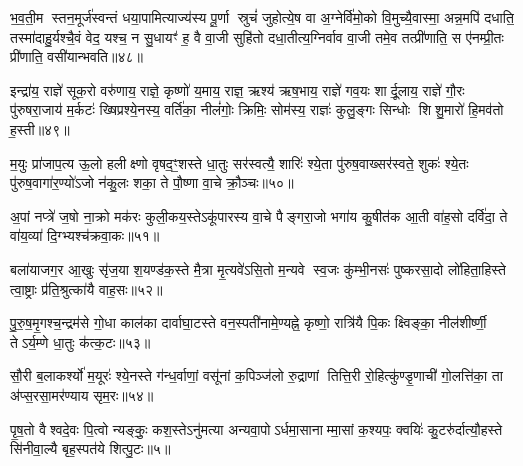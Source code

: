 भ॒व॒ती॒म स्तन॒मूर्ज॑स्वन्तं धया॒पामित्याज्य॑स्य पू॒र्णा स्रुचं॑ जुहोत्ये॒ष वा अ॒ग्नेर्वि॑मो॒को वि॒मुच्यै॒वास्मा॒ अन्न॒मपि॑ दधाति॒ तस्मा॑दाहु॒र्यश्चै॒वं वेद॒ यश्च॒ न सु॒धायꣳ॑ ह॒ वै वा॒जी सुहि॑तो दधा॒तीत्य॒ग्निर्वाव वा॒जी तमे॒व तत्प्री॑णाति॒ स ए॑नम्प्री॒तः प्री॑णाति॒ वसी॑यान्भवति॥४८॥

{\anuvakamend[{प्र॒तीची॒ दिक्तस्यास्ते द्वि॒ष्मो यश्च॑ निलि॒म्पा नामे॒ह गृ॒हा इति॑ लू॒ख्षो वसी॑यान्भवति॥10॥}]}

इन्द्रा॑य॒ राज्ञे॑ सूक॒रो वरु॑णाय॒ राज्ञे॒ कृष्णो॑ य॒माय॒ राज्ञ॒ ऋश्य॑ ऋष॒भाय॒ राज्ञे॑ गव॒यः शार्दू॒लाय॒ राज्ञे॑ गौ॒रः पु॑रुषरा॒जाय॑ म॒र्कटः॑ ख्षिप्रश्ये॒नस्य॒ वर्ति॑का॒ नीलं॑गोः॒ क्रिमिः॒ सोम॑स्य॒ राज्ञः॑ कुलु॒ङ्गः सिन्धोः शिशु॒मारो॑ हि॒मव॑तो ह॒स्ती॥४९॥

{\anuvakamend[{इन्द्रा॑या॒ष्टाविꣳ॑शतिः॥11॥}]}

म॒युः प्रा॑जाप॒त्य ऊ॒लो हलीक्ष्णो वृषद॒ꣳ॒शस्ते धा॒तुः सर॑स्वत्यै॒ शारिः॑ श्ये॒ता पु॑रुष॒वाख्सर॑स्वते॒ शुकः॑ श्ये॒तः पु॑रुष॒वागा॑र॒ण्यो॑ऽजो न॑कु॒लः शका॒ ते पौ॒ष्णा वा॒चे क्रौ॒ञ्चः॥५०॥

{\anuvakamend[{म॒युस्त्रयो॑विशतिः॥12॥}]}

अ॒पां नप्त्रे॑ ज॒षो ना॒क्रो मक॑रः कुली॒कय॒स्तेऽकू॑पारस्य वा॒चे पैङ्गरा॒जो भगा॑य कु॒षीत॑क आ॒ती वा॑ह॒सो दर्वि॑दा॒ ते वा॑य॒व्या॑ दि॒ग्भ्यश्च॑क्रवा॒कः॥५१॥

{\anuvakamend[{अ॒पामेका॒न्नविꣳ॑शतिः॥13॥}]}

बला॑याजग॒र आ॒खुः सृ॑ज॒या श॒यण्ड॑क॒स्ते मै॒त्रा मृ॒त्यवे॑ऽसि॒तो म॒न्यवे स्व॒जः कु॑म्भी॒नसः॑ पुष्करसा॒दो लो॑हिता॒हिस्ते त्वा॒ष्ट्राः प्र॑ति॒श्रुत्का॑यै वाह॒सः॥५२॥

{\anuvakamend[{}]}

पु॒रु॒ष॒मृ॒गश्च॒न्द्रम॑से गो॒धा काल॑का दार्वाघा॒टस्ते वन॒स्पती॑नामे॒ण्यह्ने॒ कृष्णो॒ रात्रि॑यै पि॒कः क्ष्विङ्का॒ नील॑शीर्ष्णी॒ तेऽर्य॒म्णे धा॒तुः क॑त्क॒टः॥५३॥

{\anuvakamend[{}]}

सौ॒री ब॒लाकर्श्यो॑ म॒यूरः॑ श्ये॒नस्ते ग॑न्ध॒र्वाणां॒ वसू॑नां क॒पिञ्ज॑लो रु॒द्राणां तित्ति॒री रो॒हित्कु॑ण्डृ॒णाची॑ गो॒लत्ति॑का॒ ता अ॑प्स॒रसा॒मर॑ण्याय सृम॒रः॥५४॥

{\anuvakamend[{}]}

पृ॒ष॒तो वैश्वदे॒वः पि॒त्वो न्यङ्कुः॒ कश॒स्तेऽनु॑मत्या अन्यवा॒पोऽर्धमा॒सानाम्मा॒सां क॒श्यपः॒ क्वयिः॑ कु॒टरु॑र्दात्यौ॒हस्ते सि॑नीवा॒ल्यै बृह॒स्पत॑ये शित्पु॒टः॥५॥

{\anuvakamend[{}]}


